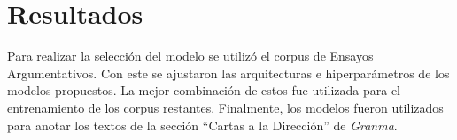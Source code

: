 \documentclass[a4paper,11pt,twocolumn,twoside]{article}
\begin{document}




\section{Resultados}

Para realizar la selección del modelo se utilizó el corpus de Ensayos Argumentativos. Con este se ajustaron
las arquitecturas e hiperparámetros de los modelos propuestos. La mejor combinación de estos fue utilizada 
para el entrenamiento de los corpus restantes. Finalmente, los modelos fueron utilizados para anotar los 
textos de la sección ``Cartas a la Dirección'' de \textit{Granma}. 
\end{document}
